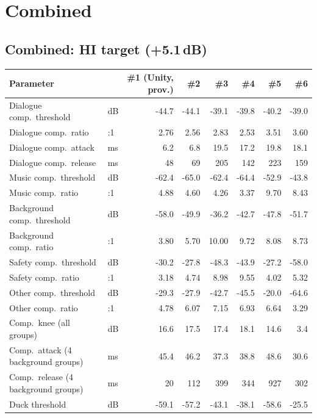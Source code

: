 \documentclass[11pt]{article}
\begin{document}
\clearpage

\section{Combined}

\subsection*{Combined: HI target (+5.1\,dB)}
\begin{table}[H]\centering\scriptsize
\begin{tabular}{@{}l l rrrrrr@{}}
\toprule
\textbf{Parameter} & & \textbf{\#1} \textbf{(Unity, prov.)} & \textbf{\#2} & \textbf{\#3} & \textbf{\#4} & \textbf{\#5} & \textbf{\#6} \\
\midrule
Dialogue comp.\ threshold & dB & -44.7 & -44.1 & -39.1 & -39.8 & -40.2 & -39.0 \\
Dialogue comp.\ ratio & :1 & 2.76 & 2.56 & 2.83 & 2.53 & 3.51 & 3.60 \\
Dialogue comp.\ attack & ms & 6.2 & 6.8 & 19.5 & 17.2 & 19.8 & 18.1 \\
Dialogue comp.\ release & ms & 48 & 69 & 205 & 142 & 223 & 159 \\
Music comp.\ threshold & dB & -62.4 & -65.0 & -62.4 & -64.4 & -52.9 & -43.8 \\
Music comp.\ ratio & :1 & 4.88 & 4.60 & 4.26 & 3.37 & 9.70 & 8.43 \\
Background comp.\ threshold & dB & -58.0 & -49.9 & -36.2 & -42.7 & -47.8 & -51.7 \\
Background comp.\ ratio & :1 & 3.80 & 5.70 & 10.00 & 9.72 & 8.08 & 8.73 \\
Safety comp.\ threshold & dB & -30.2 & -27.8 & -48.3 & -43.9 & -27.2 & -58.0 \\
Safety comp.\ ratio & :1 & 3.18 & 4.74 & 8.98 & 9.55 & 4.02 & 5.32 \\
Other comp.\ threshold & dB & -29.3 & -27.9 & -42.7 & -45.5 & -20.0 & -64.6 \\
Other comp.\ ratio & :1 & 4.78 & 6.07 & 7.15 & 6.93 & 6.64 & 3.29 \\
Comp.\ knee (all groups) & dB & 16.6 & 17.5 & 17.4 & 18.1 & 14.6 & 3.4 \\
Comp.\ attack (4 background groups) & ms & 45.4 & 46.2 & 37.3 & 38.8 & 48.6 & 30.6 \\
Comp.\ release (4 background groups) & ms & 20 & 112 & 399 & 344 & 927 & 302 \\
Duck threshold & dB & -59.1 & -57.2 & -43.1 & -38.1 & -58.6 & -25.5 \\

\end{tabular}
\end{table}
\end{document}
